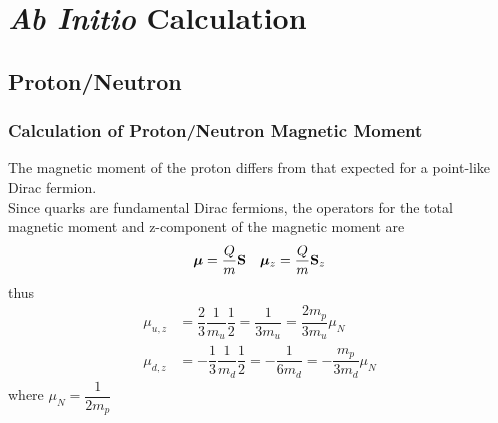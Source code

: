 \documentclass[10pt,aspectratio=43,mathserif]{beamer}
\numberwithin{equation}{section}
\begin{document}
%


\section{\textsl{Ab Initio} Calculation}
\subsection{Proton/Neutron}

\begin{frame}
\frametitle{Calculation of Proton/Neutron Magnetic Moment\cite{particle}}
The magnetic moment of the proton differs from
that expected for a point-like Dirac fermion.\\
Since quarks are fundamental Dirac fermions, the operators for the total magnetic moment and z-component of the magnetic moment are
\begin{align}
\bm\mu = \dfrac{Q}{m}\vb{S} &  & \bm\mu_z = \dfrac{Q}{m}\vb{S}_z
\end{align}
thus
\begin{align}
\mu_{u,z} &= \dfrac{2}{3}\dfrac{1}{m_u}\dfrac{1}{2} = \dfrac{1}{3m_u} =  \dfrac{2m_p}{3m_u}\mu_N \\
\mu_{d,z} &= -\dfrac{1}{3}\dfrac{1}{m_d}\dfrac{1}{2} = -\dfrac{1}{6m_d} =  -\dfrac{m_p}{3m_d}\mu_N
\end{align}
where $ \mu_N = \dfrac{1}{2m_p} $

\end{frame}
\end{document}
